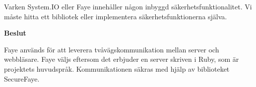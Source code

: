 Varken System.IO eller Faye innehåller någon inbyggd säkerhetsfunktionalitet. Vi måste hitta ett bibliotek eller implementera säkerhetsfunktionerna själva.

\begin{flushright}
  
  \textbf{Beslut}
  
  Faye används för att leverera tvåvägskommunikation mellan server och webbläsare. Faye väljs eftersom det erbjuder en server skriven i Ruby, som är projektets huvudspråk. Kommunikationen säkras med hjälp av biblioteket SecureFaye.
  
\end{flushright}

